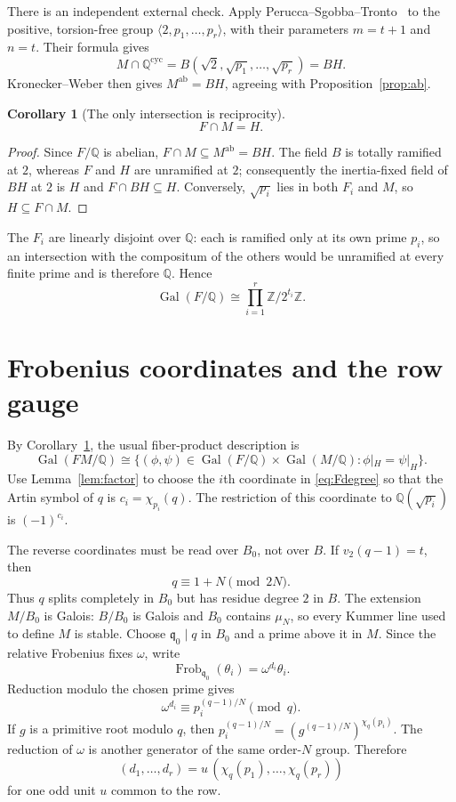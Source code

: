 \documentclass[11pt]{article}
\newtheorem{corollary}[theorem]{Corollary}
\theoremstyle{definition}
\theoremstyle{remark}
\newcommand{\Z}{\mathbb Z}
\newcommand{\Q}{\mathbb Q}
\newcommand{\Gal}{\operatorname{Gal}}
\newcommand{\Frob}{\operatorname{Frob}}
\newcommand{\vtwo}{v_2}
\newcommand{\cyc}{\mathrm{cyc}}
\begin{document}
There is an independent external check.  Apply
Perucca--Sgobba--Tronto~\cite[Theorem~5.1]{PST} to the positive,
torsion-free group $\langle2,p_1,\ldots,p_r\rangle$, with their parameters
$m=t+1$ and $n=t$.  Their formula gives
\[
  M\cap\Q^{\cyc}=B(\sqrt2,\sqrt{p_1},\ldots,\sqrt{p_r})=BH.
\]
Kronecker--Weber then gives $M^{\mathrm{ab}}=BH$, agreeing with
Proposition~\ref{prop:ab}.

\begin{corollary}[The only intersection is reciprocity]\label{cor:intersection}
\[
  F\cap M=H.
\]
\end{corollary}

\begin{proof}
Since $F/\Q$ is abelian, $F\cap M\subseteq M^{\mathrm{ab}}=BH$.  The field
$B$ is totally ramified at $2$, whereas $F$ and $H$ are unramified at
$2$; consequently the inertia-fixed field of $BH$ at $2$ is $H$ and
$F\cap BH\subseteq H$.  Conversely, $\sqrt{p_i}$ lies in both $F_i$ and
$M$, so $H\subseteq F\cap M$.
\end{proof}

The $F_i$ are linearly disjoint over $\Q$: each is ramified only at its
own prime $p_i$, so an intersection with the compositum of the others would
be unramified at every finite prime and is therefore $\Q$.  Hence
\begin{equation}\label{eq:Fdegree}
  \Gal(F/\Q)\cong\prod_{i=1}^r\Z/2^{t_i}\Z.
\end{equation}

\section{Frobenius coordinates and the row gauge}

By Corollary~\ref{cor:intersection}, the usual fiber-product description is
\begin{equation}\label{eq:fiberproduct}
 \Gal(FM/\Q)\cong
 \{(\phi,\psi)\in\Gal(F/\Q)\times\Gal(M/\Q):
   \phi|_H=\psi|_H\}.
\end{equation}
Use Lemma~\ref{lem:factor} to choose the $i$th coordinate in
\eqref{eq:Fdegree} so that the Artin symbol of $q$ is
$c_i=\chi_{p_i}(q)$.  The restriction of this coordinate to
$\Q(\sqrt{p_i})$ is $(-1)^{c_i}$.

The reverse coordinates must be read over $B_0$, not over $B$.  If
$\vtwo(q-1)=t$, then
\[
 q\equiv1+N\pmod{2N}.
\]
Thus $q$ splits completely in $B_0$ but has residue degree $2$ in $B$.
The extension $M/B_0$ is Galois: $B/B_0$ is Galois and $B_0$ contains
$\mu_N$, so every Kummer line used to define $M$ is stable.  Choose
$\mathfrak q_0\mid q$ in $B_0$ and a prime above it in $M$.  Since
the relative Frobenius fixes $\omega$, write
\[
  \Frob_{\mathfrak q_0}(\theta_i)=\omega^{d_i}\theta_i.
\]
Reduction modulo the chosen prime gives
\[
  \omega^{d_i}\equiv p_i^{(q-1)/N}\pmod q.
\]
If $g$ is a primitive root modulo $q$, then
$p_i^{(q-1)/N}=(g^{(q-1)/N})^{\chi_q(p_i)}$.  The reduction of $\omega$
is another generator of the same order-$N$ group.  Therefore
\begin{equation}\label{eq:rowgauge}
  (d_1,\ldots,d_r)=u\,(\chi_q(p_1),\ldots,\chi_q(p_r))
\end{equation}
for one odd unit $u$ common to the row.
\end{document}
